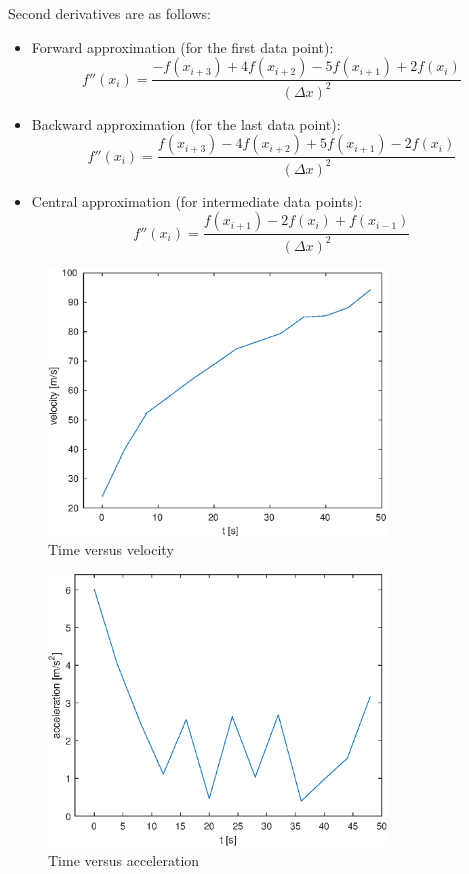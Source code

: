 \documentclass[12pt, a4paper]{article}
\numberwithin{equation}{section}
\begin{document}
Second derivatives are as follows:

\begin{itemize}
    \item Forward approximation (for the first data point):
    \begin{equation}
        f''(x_i) = \frac{-f(x_{i+3}) + 4f(x_{i+2}) - 5f(x_{i+1}) + 2f(x_i)}{(\Delta x)^2}
    \end{equation}
    \item Backward approximation (for the last data point):
    \begin{equation}
        f''(x_i) = \frac{f(x_{i+3}) - 4f(x_{i+2}) + 5f(x_{i+1}) - 2f(x_i)}{(\Delta x)^2}
    \end{equation}
    \item Central approximation (for intermediate data points):
    \begin{equation}
        f''(x_i) = \frac{f(x_{i+1}) - 2f(x_i) + f(x_{i-1})}{(\Delta x)^2}
    \end{equation}
\end{itemize}

\begin{figure}[H]
  \centering
  \includegraphics[width=0.8\textwidth]{img/9_1.eps}
  \captionsetup{justification=centering}
  \caption{Time versus velocity}
\end{figure}

\begin{figure}[H]
  \centering
  \includegraphics[width=0.8\textwidth]{img/9_2.eps}
  \captionsetup{justification=centering}
  \caption{Time versus acceleration}
\end{figure}
\end{document}
